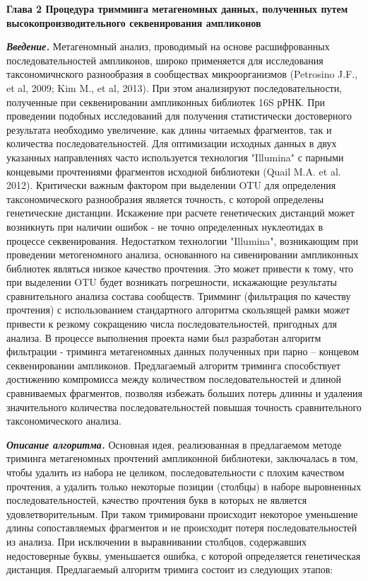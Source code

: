 \documentclass[a4paper,12pt,openany,final]{extreport}
\begin{document}
\textbf{Глава 2 Процедура тримминга метагеномных данных, полученных
путем высокопроизводительного секвенирования ампликонов}

\emph{\textbf{Введение.}} Метагеномный анализ, проводимый на основе
расшифрованных последовательностей ампликонов, широко применяется для
исследования таксономичнского разнообразия в сообществах микроорганизмов
(Petrosino J.F., et al, 2009; Kim M., et al, 2013). При этом анализируют
последовательности, полученные при секвенировании ампликонных библиотек
16S рРНК. При проведении подобных исследований для получения
статистически достоверного результата необходимо увеличение, как длины
читаемых фрагментов, так и количества последовательностей. Для
оптимизации исходных данных в двух указанных направлениях часто
используется технология "Illumina" с парными концевыми прочтениями
фрагментов исходной библиотеки (Quail M.A. et al. 2012). Критически
важным фактором при выделении OTU для определения таксономического
разнообразия является точность, с которой определены генетические
дистанции. Искажение при расчете генетических дистанций может возникнуть
при наличии ошибок - не точно определенных нуклеотидах в процессе
секвенирования. Недостатком технологии "Illumina", возникающим при
проведении метогеномного анализа, основанного на сивенировании
ампликонных библиотек являться низкое качество прочтения. Это может
привести к тому, что при выделении OTU будет возникать погрешности,
искажающие результаты сравнительного анализа состава сообществ. Тримминг
(фильтрация по качеству прочтения) с использованием стандартного
алгоритма скользящей рамки может привести к резкому сокращению числа
последовательностей, пригодных для анализа. В процессе выполнения
проекта нами был разработан алгоритм фильтрации - триминга метагеномных
данных полученных при парно -- концевом секвенировании ампликонов.
Предлагаемый алгоритм триминга способствует достижению компромисса между
количеством последовательностей и длиной сравниваемых фрагментов,
позволяя избежать больших потерь длинны и удаления значительного
количества последовательностей повышая точность сравнительного
таксономического анализа.

\emph{\textbf{Описание алгоритма.}} Основная идея, реализованная в
предлагаемом методе триминга метагеномных прочтений ампликонной
библиотеки, заключалась в том, чтобы удалить из набора не целиком,
последовательности с плохим качеством прочтения, а удалить только
некоторые позиции (столбцы) в наборе выровненных последовательностей,
качество прочтения букв в которых не является удовлетворительным. При
таком тримировани происходит некоторое уменьшение длины сопоставляемых
фрагментов и не происходит потеря последовательностей из анализа. При
исключении в выравнивании столбцов, содержавших недостоверные буквы,
уменьшается ошибка, с которой определяется генетическая дистанция.
Предлагаемый алгоритм тримига состоит из следующих этапов:
\end{document}
